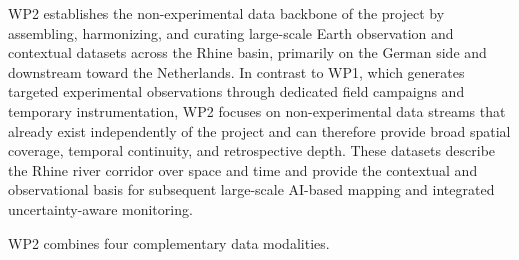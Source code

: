 \documentclass{scrartcl}
\begin{document}
WP2 establishes the non-experimental data backbone of the project by assembling, harmonizing, and curating large-scale Earth observation and contextual datasets across the Rhine basin, primarily on the German side and downstream toward the Netherlands. In contrast to WP1, which generates targeted experimental observations through dedicated field campaigns and temporary instrumentation, WP2 focuses on non-experimental data streams that already exist independently of the project and can therefore provide broad spatial coverage, temporal continuity, and retrospective depth. These datasets describe the Rhine river corridor over space and time and provide the contextual and observational basis for subsequent large-scale AI-based mapping and integrated uncertainty-aware monitoring.

WP2 combines four complementary data modalities.
\end{document}
